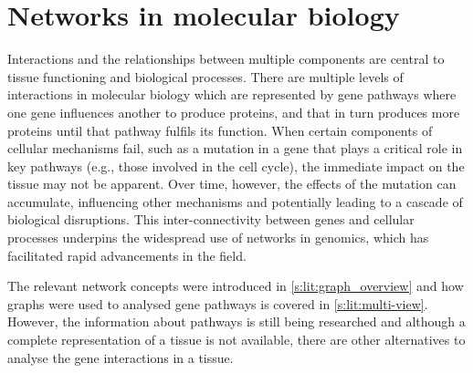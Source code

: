 \section{Networks in molecular biology} \label{s:lit:nets_bio}

\vspace{3mm}
\vspace{3mm}

Interactions and the relationships between multiple components are central to tissue functioning and biological processes. There are multiple levels of interactions in molecular biology which are represented by gene pathways where one gene influences another to produce proteins, and that in turn produces more proteins until that pathway fulfils its function. When certain components of cellular mechanisms fail, such as a mutation in a gene that plays a critical role in key pathways (e.g., those involved in the cell cycle), the immediate impact on the tissue may not be apparent. Over time, however, the effects of the mutation can accumulate, influencing other mechanisms and potentially leading to a cascade of biological disruptions. This inter-connectivity between genes and cellular processes underpins the widespread use of networks in genomics, which has facilitated rapid advancements in the field.

The relevant network concepts were introduced in \cref{s:lit:graph_overview}
and how graphs were used to analysed gene pathways is covered in \cref{s:lit:multi-view}. However, the information about pathways is still being researched and although a complete representation of a tissue is not available, there are other alternatives to analyse the gene interactions in a tissue.

